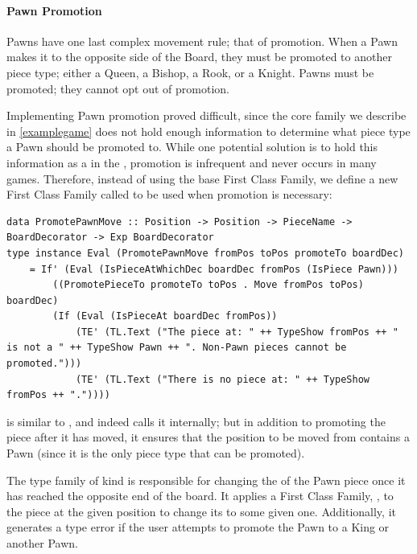\paragraph{Pawn Promotion}

Pawns have one last complex movement rule; that of promotion. When a Pawn makes it to the opposite side of the Board, they must be promoted to another piece type; either a Queen, a Bishop, a Rook, or a Knight. Pawns must be promoted; they cannot opt out of promotion.

Implementing Pawn promotion proved difficult, since the core  family we describe in \cref{examplegame} does not hold enough information to determine what piece type a Pawn should be promoted to. While one potential solution is to hold this information as a  in the , promotion is infrequent and never occurs in many games. Therefore, instead of using the base  First Class Family, we define a new First Class Family called  to be used when promotion is necessary:

\enlargethispage{\baselineskip}  %

\begin{lstlisting}
data PromotePawnMove :: Position -> Position -> PieceName -> BoardDecorator -> Exp BoardDecorator
type instance Eval (PromotePawnMove fromPos toPos promoteTo boardDec)
    = If' (Eval (IsPieceAtWhichDec boardDec fromPos (IsPiece Pawn)))
        ((PromotePieceTo promoteTo toPos . Move fromPos toPos) boardDec)
        (If (Eval (IsPieceAt boardDec fromPos))
            (TE' (TL.Text ("The piece at: " ++ TypeShow fromPos ++ " is not a " ++ TypeShow Pawn ++ ". Non-Pawn pieces cannot be promoted.")))
            (TE' (TL.Text ("There is no piece at: " ++ TypeShow fromPos ++ "."))))
\end{lstlisting}

 is similar to , and indeed calls it internally; but in addition to promoting the piece after it has moved, it ensures that the position to be moved from contains a Pawn (since it is the only piece type that can be promoted).

The type family  of kind  is responsible for changing the  of the Pawn piece once it has reached the opposite end of the board. It applies a First Class Family, , to the piece at the given position to change its  to some given one. Additionally, it generates a type error if the user attempts to promote the Pawn to a King or another Pawn.

